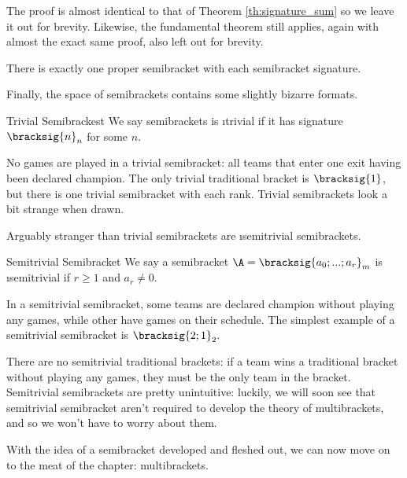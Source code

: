 {    The proof is almost identical to that of Theorem \ref{th:signature_sum} so we leave it out for brevity. Likewise, the fundamental theorem still applies, again with almost the exact same proof, also left out for brevity.

    \begin{theorem}{}{}
        There is exactly one proper semibracket with each semibracket signature.
    \end{theorem}

    Finally, the space of semibrackets contains some slightly bizarre formats.

    \begin{definition}{Trivial Semibrackest}{}
        We say semibrackets is \i{trivial} if it has signature $\bracksig{n}_n$ for some $n$.
    \end{definition}

    No games are played in a trivial semibracket: all teams that enter one exit having been declared champion. The only trivial traditional bracket is $\bracksig{1}$, but there is one trivial semibracket with each rank. Trivial semibrackets look a bit strange when drawn.


    Arguably stranger than trivial semibrackets are \i{semitrivial} semibrackets.

    \begin{definition}{Semitrivial Semibracket}{}
        We say a semibracket $\A = \bracksig{a_0; ...; a_r}_m$ is \i{semitrivial} if $r \geq 1$ and $a_r \neq 0.$
    \end{definition}

    In a semitrivial semibracket, some teams are declared champion without playing any games, while other have games on their schedule. The simplest example of a semitrivial semibracket is $\bracksig{2;1}_2.$


    There are no semitrivial traditional brackets: if a team wins a traditional bracket without playing any games, they must be the only team in the bracket. Semitrivial semibrackets are pretty unintuitive: luckily, we will soon see that semitrivial semibracket aren't required to develop the theory of multibrackets, and so we won't have to worry about them.

    With the idea of a semibracket developed and fleshed out, we can now move on to the meat of the chapter: multibrackets.
}